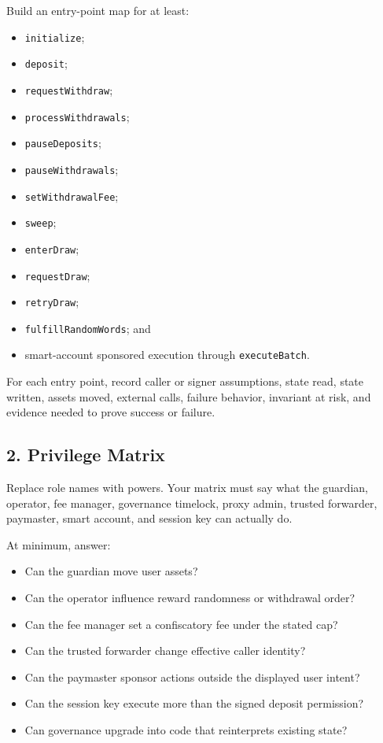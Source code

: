Build an entry-point map for at least:

\begin{itemize}
\item \texttt{initialize};
\item \texttt{deposit};
\item \texttt{requestWithdraw};
\item \texttt{processWithdrawals};
\item \texttt{pauseDeposits};
\item \texttt{pauseWithdrawals};
\item \texttt{setWithdrawalFee};
\item \texttt{sweep};
\item \texttt{enterDraw};
\item \texttt{requestDraw};
\item \texttt{retryDraw};
\item \texttt{fulfillRandomWords}; and
\item smart-account sponsored execution through \texttt{executeBatch}.
\end{itemize}

For each entry point, record caller or signer assumptions, state read, state written, assets moved, external calls, failure behavior, invariant at risk, and evidence needed to prove success or failure.

\subsection*{2. Privilege Matrix}

Replace role names with powers. Your matrix must say what the guardian, operator, fee manager, governance timelock, proxy admin, trusted forwarder, paymaster, smart account, and session key can actually do.

At minimum, answer:

\begin{itemize}
\item Can the guardian move user assets?
\item Can the operator influence reward randomness or withdrawal order?
\item Can the fee manager set a confiscatory fee under the stated cap?
\item Can the trusted forwarder change effective caller identity?
\item Can the paymaster sponsor actions outside the displayed user intent?
\item Can the session key execute more than the signed deposit permission?
\item Can governance upgrade into code that reinterprets existing state?
\end{itemize}


